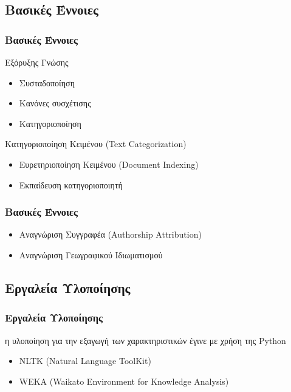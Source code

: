 \documentclass{beamer}
\begin{document}
\begin{frame}
	\section{Βασικές Έννοιες}
		\frametitle{Βασικές Έννοιες}
		{\Large Εξόρυξης Γνώσης}
		\begin{itemize}
			\item Συσταδοποίηση
			\item Κανόνες συσχέτισης
			\item Κατηγοριοποίηση\linebreak
		\end{itemize}
		{\Large Κατηγοριοποίηση Κειμένου (Text Categorization)}
		\begin{itemize}
			\item Ευρετηριοποίηση Κειμένου (Document Indexing)
			\item Εκπαίδευση κατηγοριοποιητή
		\end{itemize}
\end{frame}
\begin{frame}
	\frametitle{Βασικές Έννοιες}
	\begin{itemize}
		\item {\Large Αναγνώριση Συγγραφέα (Authorship Attribution)} \linebreak
		\item {\Large Αναγνώριση Γεωγραφικού Ιδιωματισμού}
	\end{itemize}
\end{frame}
\begin{frame}
	\section{Εργαλεία Υλοποίησης}
		\frametitle{Εργαλεία Υλοποίησης}
		η υλοποίηση για την εξαγωγή των χαρακτηριστικών έγινε με χρήση της Python \linebreak
		\begin{itemize}
			\item {} {\Large NLTK} (Natural Language ToolKit)\linebreak
			\item {} {\Large WEKA} (Waikato Environment for Knowledge Analysis)
		\end{itemize}
		
\end{frame}
\end{document}

